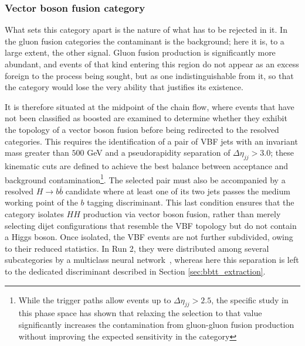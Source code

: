 \subsubsection{Vector boson fusion category}
%
What sets this category apart is the nature of what has to be rejected in it. In the gluon fusion categories the contaminant is the background; here it is, to a large extent, the other signal. Gluon fusion production is significantly more abundant, and events of that kind entering this region do not appear as an excess foreign to the process being sought, but as one indistinguishable from it, so that the category would lose the very ability that justifies its existence.

It is therefore situated at the midpoint of the chain flow, where events that have not been classified as boosted are examined to determine whether they exhibit the topology of a vector boson fusion before being redirected to the resolved categories. This requires the identification of a pair of VBF jets with an invariant mass greater than $500$ GeV and a pseudorapidity separation of $\Delta\eta_{jj} > 3.0$; these kinematic cuts are defined to achieve the best balance between acceptance and background contamination\footnote{While the trigger paths allow events up to $\Delta\eta_{jj} > 2.5$, the specific study in this phase space has shown that relaxing the selection to that value significantly increases the contamination from gluon-gluon fusion production without improving the expected sensitivity in the category}. The selected pair must also be accompanied by a resolved $H\to b\bar{b}$ candidate where at least one of its two jets passes the medium working point of the $b$ tagging discriminant. This last condition ensures that the category isolates $HH$ production via vector boson fusion, rather than merely selecting dijet configurations that resemble the VBF topology but do not contain a Higgs boson. Once isolated, the VBF events are not further subdivided, owing to their reduced statistics. In Run 2, they were distributed among several subcategories by a multiclass neural network~\cite{CMS-HIG-20-010}, whereas here this separation is left to the dedicated discriminant described in Section \ref{sec:bbtt_extraction}.





